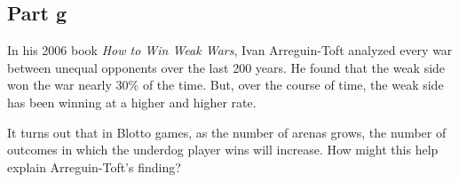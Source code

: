 \documentclass[10pt]{article}
\begin{document}
\newpage

\subsection*{Part g} In his 2006 book \emph{How to Win Weak Wars}, Ivan Arreguin-Toft analyzed every war between unequal opponents over the last 200 years. He found that the weak side won the war nearly 30\% of the time. But, over the course of time, the weak side has been winning at a higher and higher rate.

It turns out that in Blotto games, as the number of arenas grows, the number of outcomes in which the underdog player wins will increase. How might this help explain Arreguin-Toft's finding?
\end{document}
